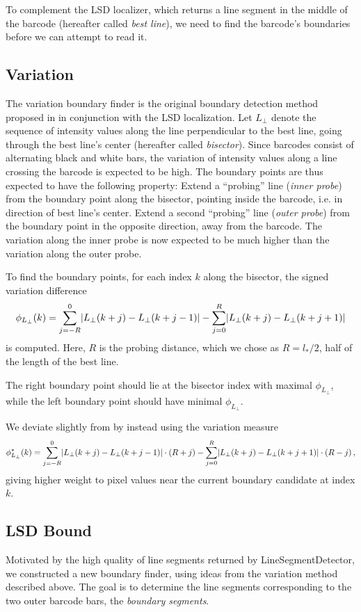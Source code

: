 To complement the LSD localizer, which returns a line segment in the middle of
the barcode (hereafter called \emph{best line}), we need to find the barcode's boundaries before we can attempt to read it.

\subsection{Variation}
The variation boundary finder is the original boundary detection method proposed
in \cite{Creusot2016} in conjunction with the LSD localization. Let $L_\perp$
denote the sequence of intensity values along the line perpendicular to the best
line, going through the best line's center (hereafter called \emph{bisector}).
Since barcodes consist of alternating black and white bars, the variation of
intensity values along a line crossing the barcode is expected to be high. The
boundary points are thus expected to have the following property: Extend a 
``probing'' line (\emph{inner probe}) from the boundary point along the bisector, pointing inside the
barcode, i.e. in direction of best line's center. Extend a second ``probing''
line (\emph{outer probe}) from the boundary point in the opposite direction, away from the barcode.
The variation along the inner probe is now expected to be much higher than the
variation along the outer probe.

To find the boundary points, for each index $k$ along the bisector, the signed variation
difference
\begin{equation*}
 \phi_{L_\perp} (k)=\sum_{j=-R}^{0}\lvert L_\perp(k+j)-L_\perp(k+j-1)\rvert-\sum_{j=0}^{R}\lvert L_\perp(k+j)-L_\perp(k+j+1)\rvert
\end{equation*}
is computed. Here, $R$ is the probing distance, which we chose as $R=l_*/2$,
half of the length of the best line.

The right boundary point should lie at the
bisector index with maximal $\phi_{L_\perp}$, while the left boundary point
should have minimal $\phi_{L_\perp}$.

We deviate slightly from \citeauthor{Creusot2016} by instead using the variation
measure
\begin{equation*}
 \phi_{L_\perp}^* (k)=\sum_{j=-R}^{0}\lvert L_\perp(k+j)-L_\perp(k+j-1)\rvert\cdot (R+j)-\sum_{j=0}^{R}\lvert L_\perp(k+j)-L_\perp(k+j+1)\rvert\cdot (R-j)\,,
\end{equation*}
giving higher weight to pixel values near the current boundary candidate at
index $k$.

\subsection{LSD Bound}
Motivated by the high quality of line segments returned by LineSegmentDetector,
we constructed a new boundary finder, using ideas from the variation method
described above. The goal is to determine the line segments corresponding to the two
outer barcode bars, the \emph{boundary segments}.

